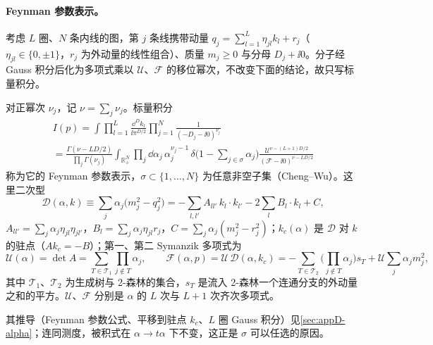 \paragraph{Feynman 参数表示。}
考虑 $L$ 圈、$N$ 条内线的图，第 $j$ 条线携带动量 $q_j=\sum_{l=1}^L\eta_{jl}k_l+r_j$（$\eta_{jl}\in\{0,\pm1\}$，$r_j$ 为外动量的线性组合）、质量 $m_j\ge0$ 与分母 $D_j+\ii0$。分子经 Gauss 积分后化为多项式乘以 $\mathcal U$、$\mathcal F$ 的移位幂次，不改变下面的结论，故只写标量积分。

\begin{definition}\label{def:ir-landau-setup}
对正幂次 $\nu_j$，记 $\nu=\sum_j\nu_j$。标量积分
\begin{multline}\label{eq:ir-param}
I(p)=\int\prod_{l=1}^{L}\frac{\dd^Dk_l}{\ii\pi^{D/2}}\prod_{j=1}^{N}\frac{1}{(-D_j-\ii0)^{\nu_j}}\\
=\frac{\Gamma(\nu-LD/2)}{\prod_j\Gamma(\nu_j)}\int_{\mathbb R_+^N}\prod_j\dd\alpha_j\,\alpha_j^{\nu_j-1}\,\delta\Big(1-\sum_{j\in\sigma}\alpha_j\Big)\frac{\mathcal U^{\nu-(L+1)D/2}}{(\mathcal F-\ii0)^{\nu-LD/2}}
\end{multline}
称为它的 Feynman 参数表示，$\sigma\subset\{1,\dots,N\}$ 为任意非空子集（Cheng--Wu）。这里二次型
\begin{equation}\label{eq:ir-quadform}
\mathcal D(\alpha,k)\equiv\sum_j\alpha_j\big(m_j^2-q_j^2\big)=-\sum_{l,l'}A_{ll'}\,k_l\cdot k_{l'}-2\sum_lB_l\cdot k_l+C ,
\end{equation}
$A_{ll'}=\sum_j\alpha_j\eta_{jl}\eta_{jl'}$，$B_l=\sum_j\alpha_j\eta_{jl}r_j$，$C=\sum_j\alpha_j(m_j^2-r_j^2)$；$k_c(\alpha)$ 是 $\mathcal D$ 对 $k$ 的驻点（$Ak_c=-B$）；第一、第二 Symanzik 多项式为
\begin{equation}\label{eq:ir-UF}
\mathcal U(\alpha)=\det A=\sum_{T\in\mathcal T_1}\prod_{j\notin T}\alpha_j ,\qquad
\mathcal F(\alpha,p)=\mathcal U\,\mathcal D(\alpha,k_c)=-\sum_{T\in\mathcal T_2}\Big(\prod_{j\notin T}\alpha_j\Big)s_T+\mathcal U\sum_j\alpha_jm_j^2 ,
\end{equation}
其中 $\mathcal T_1$、$\mathcal T_2$ 为生成树与 2-森林的集合，$s_T$ 是流入 2-森林一个连通分支的外动量之和的平方。$\mathcal U$、$\mathcal F$ 分别是 $\alpha$ 的 $L$ 次与 $L+1$ 次齐次多项式。
\end{definition}

其推导（Feynman 参数公式、平移到驻点 $k_c$、$L$ 圈 Gauss 积分）见\cref{sec:appD-alpha}；连同测度，被积式在 $\alpha\to t\alpha$ 下不变，这正是 $\sigma$ 可以任选的原因。

